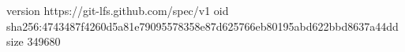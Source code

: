version https://git-lfs.github.com/spec/v1
oid sha256:4743487f4260d5a81e79095578358e87d625766eb80195abd622bbd8637a44dd
size 349680
